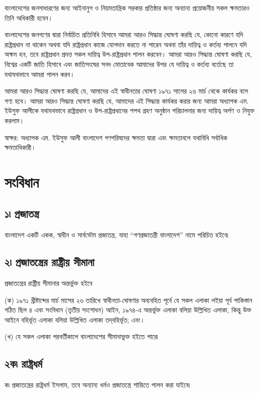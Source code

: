 \documentclass[11pt]{article}
\begin{document}
বাংলাদেশের জনসাধারণের জন্য আইনানুগ ও নিয়মতান্ত্রিক সরকার প্রতিষ্ঠার জন্য
অন্যান্য প্রয়োজনীয় সকল ক্ষমতারও তিনি অধিকারী হবেন।

বাংলাদেশের জনগণের দ্বারা নির্বাচিত প্রতিনিধি হিসাবে আমরা আরও সিদ্ধান্ত
ঘোষণা করছি যে, কোনো কারণে যদি রাষ্ট্রপ্রধান না থাকেন অথবা যদি রাষ্ট্রপ্রধান
কাজে যোগদান করতে না পারেন অথবা তাঁর দায়িত্ব ও কর্তব্য পালনে যদি অক্ষম হন,
তবে রাষ্ট্রপ্রধান প্রদত্ত সকল দায়িত্ব উপ-রাষ্ট্রপ্রধান পালন করবেন। আমরা আরও
সিদ্ধান্ত ঘোষণা করছি যে, বিশ্বের একটি জাতি হিসাবে এবং জাতিসংঘের সনদ
মোতাবেক আমাদের উপর যে দায়িত্ব ও কর্তব্য বর্তেছে তা যথাযথভাবে আমরা পালন
করব।

আমরা আরও সিদ্ধান্ত ঘোষণা করছি যে, আমাদের এই স্বাধীনতার ঘোষণা ১৯৭১ সালের
২৬ মার্চ থেকে কার্যকর বলে গণ্য হবে। আমরা আরও সিদ্ধান্ত ঘোষণা করছি যে,
আমাদের এই সিদ্ধান্ত কার্যকর করার জন্য আমরা অধ্যাপক এম. ইউসুফ আলীকে যথাযথভাবে
রাষ্ট্রপ্রধান ও উপ-রাষ্ট্রপ্রধানের শপথ গ্রহণ অনুষ্ঠান পরিচালনার জন্য দায়িত্ব অর্পণ
ও নিযুক্ত করলাম।

স্বাক্ষর: অধ্যাপক এম. ইউসুফ আলী
বাংলাদেশ গণপরিষদের ক্ষমতা দ্বারা
এবং ক্ষমতাবলে যথাবিধি সর্বাধিক ক্ষমতাধিকারী।

\section{সংবিধান}
\label{sec:org087eb10}
\subsection{১৷ প্রজাতন্ত্র}
\label{sec:orgd27acc2}
বাংলাদেশ একটি একক, স্বাধীন ও সার্বভৌম প্রজাতন্ত্র, যাহা “গণপ্রজাতন্ত্রী বাংলাদেশ” নামে পরিচিত হইবে৷

\subsection{২৷ প্রজাতন্ত্রের রাষ্ট্রীয় সীমানা}
\label{sec:org29b9f30}
প্রজাতন্ত্রের রাষ্ট্রীয় সীমানার অন্তর্ভুক্ত হইবে

(ক) ১৯৭১ খ্রীষ্টাব্দের মার্চ মাসের ২৬ তারিখে স্বাধীনতা-ঘোষণার অব্যবহিত পূর্বে
    যে সকল এলাকা লইয়া পূর্ব পাকিস্তান গঠিত ছিল ৪ এবং সংবিধান (তৃতীয় সংশোধন)
    আইন, ১৯৭৪-এ অন্তর্ভুক্ত এলাকা বলিয়া উল্লিখিত এলাকা, কিন্তু উক্ত আইনে বহির্ভূত
    এলাকা বলিয়া উল্লিখিত এলাকা তদ্‌বহির্ভূত; এবং।

(খ) যে সকল এলাকা পরবর্তীকালে বাংলাদেশের সীমানাভুক্ত হইতে পারে৷

\subsection{২ক৷ রাষ্ট্রধর্ম}
\label{sec:orgdc64386}
ক৷ প্রজাতন্ত্রের রাষ্ট্রধর্ম ইসলাম, তবে অন্যান্য ধর্মও প্রজাতন্ত্রে শান্তিতে পালন করা যাইবে৷
\end{document}
